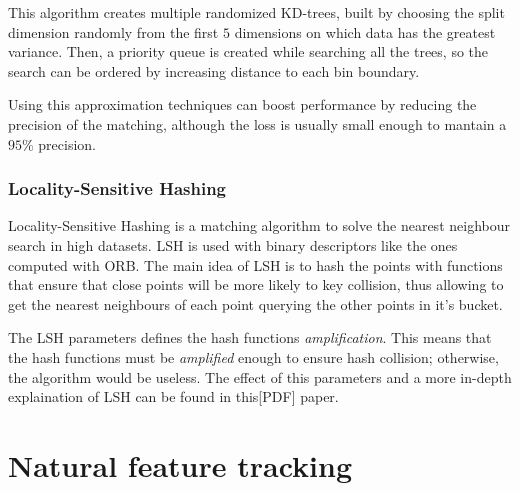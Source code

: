 This algorithm creates multiple randomized KD-trees, built by choosing the
split dimension randomly from the first $5$ dimensions on which data has the
greatest variance. Then, a priority queue is created while searching all the
trees, so the search can be ordered by increasing distance to each bin
boundary. 

Using this approximation techniques can boost performance by reducing the
precision of the matching, although the loss is usually small enough to mantain
a $95\%$ precision. 

\subsubsection{Locality-Sensitive Hashing}
Locality-Sensitive Hashing is a matching algorithm to solve the nearest
neighbour search in high datasets. LSH is used with binary descriptors like the
ones computed with ORB. The main idea of LSH is to hash the points with
functions that ensure that close points will be more likely to key collision,
thus allowing to get the nearest neighbours of each point querying the other
points in it's bucket.

The LSH parameters defines the hash functions \emph{amplification}. This means that
the hash functions must be \emph{amplified} enough to ensure hash collision;
otherwise, the algorithm would be useless. The effect of this parameters and a more
in-depth explaination of LSH can be found in this[PDF] paper.

\section{Natural feature tracking}

